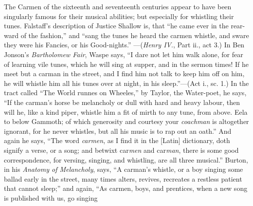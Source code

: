 The Carmen of the sixteenth and seventeenth centuries appear to have been
singularly famous for their musical abilities; but especially for whistling their
tunes. Falstaff’s description of Justice Shallow is, that “he came ever in the
rear-ward of the fashion,” and “sang the tunes he heard the carmen whistle,
and sware they were his Fancies, or his Good-nights.”
—(\textit{Henry IV}., Part ii.,
act 3.) In Ben Jonson’s \textit{Bartholomew Fair}, Waspe says, “I dare not let him
walk alone, for fear of learning vile tunes, which he will sing at supper, and in
the sermon times! If he meet but a carman in the street, and I find him not
talk to keep him off on him, he will whistle him all his tunes over at night, in his
sleep.”—(Act i., sc. 1.) In the tract called “The World runnes on Wheeles,”
by Taylor, the Water-poet, he says, “If the carman’s horse be melancholy or
dull with hard and heavy labour, then will he, like a kind piper, whistle him a
fit of mirth to any tune, from above. Eela to below Gammoth;
 of which generosity
and courtesy your \textit{coachman} is altogether ignorant, for he never whistles,
but all his music is to rap out an oath.” And again he says, “The word \textit{carmen},
as I find it in the [Latin] dictionary, doth signify a verse, or a song; and betwixt
car\textit{men} and car\textit{man}, there is some good correspondence, for versing, singing, and
whistling, are all three musical.” Burton, in his \textit{Anatomy of Melancholy}, says,
“A carman’s whistle, or a boy singing some ballad early in the street, many
times alters, revives, recreates a restless patient that cannot sleep;” and again,
“As carmen, boys, and prentices, when a new song is published with us, go singing
